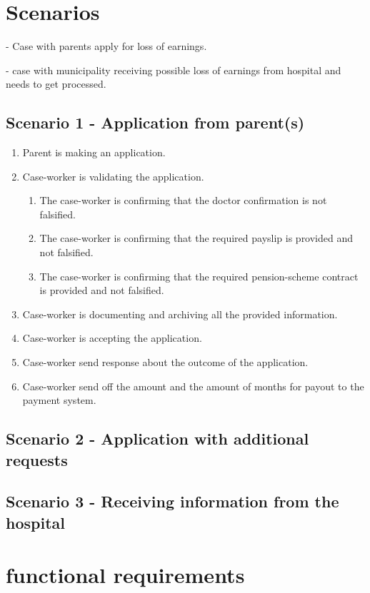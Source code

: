 \documentclass{article}
\begin{document}
\section{Scenarios}

- Case with parents apply for loss of earnings.

- case with municipality receiving possible loss of earnings from hospital and needs to get processed.

\subsection{Scenario 1 - Application from parent(s)}
\begin{enumerate}
    \item Parent is making an application.
    \item Case-worker is validating the application.
        \begin{enumerate}
            \item The case-worker is confirming that the doctor confirmation is not falsified.
            \item The case-worker is confirming that the required payslip is provided and not falsified. 
            \item The case-worker is confirming that the required pension-scheme contract is provided and not falsified.
        \end{enumerate}
    \item Case-worker is documenting and archiving all the provided information. 
    \item Case-worker is accepting the application. 
    \item Case-worker send response about the outcome of the application.
    \item Case-worker send off the amount and the amount of months for payout to the payment system. 
\end{enumerate}

\subsection{Scenario 2 - Application with additional requests}

\subsection{Scenario 3 - Receiving information from the hospital}

\section{functional requirements}
\end{document}
